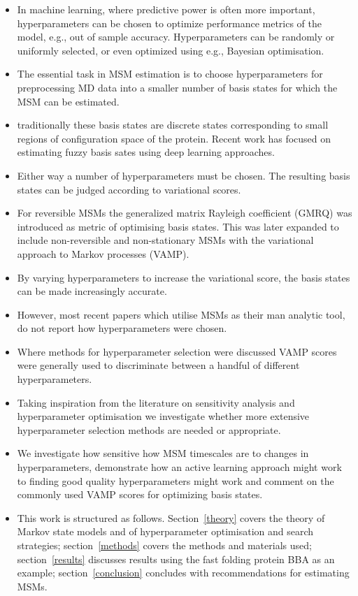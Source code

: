 \documentclass[journal=jacsat,manuscript=article]{achemso}
\begin{document}
\begin{itemize}
    \item In machine learning, where predictive power is often more important, hyperparameters can be chosen to optimize performance metrics of the model, e.g., out of sample accuracy. Hyperparameters can be randomly or uniformly selected, or even optimized using e.g., Bayesian optimisation.  
    \item The essential task in MSM estimation is to choose hyperparameters for preprocessing MD data into a smaller number of basis  states for which the MSM can be estimated. 
    \item traditionally these basis states are discrete states corresponding to small regions of configuration space of the protein. Recent work has focused on estimating fuzzy basis sates using deep learning approaches.  
    \item Either way a number of hyperparameters must be chosen. The resulting basis states can be judged according to variational scores. 
    \item For reversible MSMs the generalized matrix Rayleigh coefficient (GMRQ) was introduced as metric of optimising basis states.  This was later expanded to include non-reversible and non-stationary MSMs with the variational approach to Markov processes (VAMP). 
    \item By varying hyperparameters to increase the variational score, the basis states can be made increasingly accurate. 
    \item  However, most recent papers which utilise MSMs as their man analytic tool, do not report how hyperparameters were chosen.  
    \item Where methods for hyperparameter selection were discussed VAMP scores were generally used to discriminate between a handful of different hyperparameters.  
    \item Taking inspiration from the literature on sensitivity analysis and hyperparameter optimisation we investigate whether more extensive hyperparameter selection methods are needed or appropriate. 
    \item We investigate how sensitive how MSM timescales are to changes in hyperparameters, demonstrate how an active learning approach might work to finding good quality hyperparameters might work and comment on the commonly used VAMP scores for optimizing basis states.
    \item This work is structured as follows. Section~\ref{theory} covers the theory of Markov state models and of hyperparameter optimisation and search strategies; section~\ref{methods} covers the methods and materials used; section~\ref{results} discusses results using the fast folding protein BBA as an example; section~\ref{conclusion} concludes with recommendations for estimating MSMs. 

\end{itemize}
\end{document}
